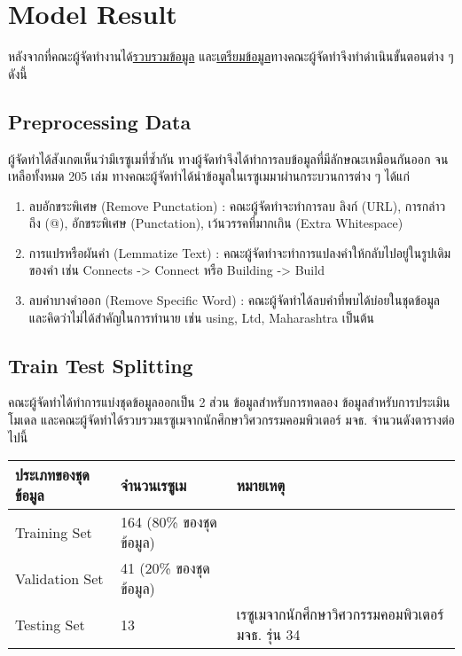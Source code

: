 \section{Model Result}
หลังจากที่คณะผู้จัดทำงานได้\hyperref[subsec:Data Collecting]{รวบรวมข้อมูล} และ\hyperref[subsec:Data Preparation]{เตรียมข้อมูล}ทางคณะผู้จัดทำจึงทำดำเนินขั้นตอนต่าง ๆ ดังนี้
\subsection{Preprocessing Data}
ผู้จัดทำได้สังเกตเห็นว่ามีเรซูเมที่ซ้ำกัน ทางผู้จัดทำจึงได้ทำการลบข้อมูลที่มีลักษณะเหมือนกันออก จนเหลือทั้งหมด 205 เล่ม
ทางคณะผู้จัดทำได้นำข้อมูลในเรซูเมมาผ่านกระบวนการต่าง ๆ ได้แก่
\begin{enumerate}
    \item ลบอักขระพิเศษ (Remove Punctation) : คณะผู้จัดทำจะทำการลบ ลิงก์ (URL), การกล่าวถึง (@), อักขระพิเศษ (Punctation), เว้นวรรคที่มากเกิน (Extra Whitespace)
    \item การแปรหรือผันคำ (Lemmatize Text) : คณะผู้จัดทำจะทำการแปลงคำให้กลับไปอยู่ในรูปเดิมของคำ เช่น Connects -> Connect หรือ Building -> Build
    \item ลบคำบางคำออก (Remove Specific Word) : คณะผู้จัดทำได้ลบคำที่พบได้บ่อยในชุดข้อมูล และคิดว่าไม่ได้สำคัญในการทำนาย เช่น using, Ltd, Maharashtra เป็นต้น
\end{enumerate}
\subsection{Train Test Splitting}
คณะผู้จัดทำได้ทำการแบ่งชุดข้อมูลออกเป็น 2 ส่วน ข้อมูลสำหรับการทดลอง ข้อมูลสำหรับการประเมินโมเดล
และคณะผู้จัดทำได้รวบรวมเรซูเมจากนักศึกษาวิศวกรรมคอมพิวเตอร์ มจธ. จำนวนดังตารางต่อไปนี้
\begin{table}[H]
    \begin{tabularx}{\textwidth}{X|X|l}
        ประเภทของชุดข้อมูล & จำนวนเรซูเม            & หมายเหตุ                                   \\ \hline
        Training Set    & 164 (80\% ของชุดข้อมูล) &                                           \\ \hline
        Validation Set  & 41 (20\% ของชุดข้อมูล)  &                                           \\ \hline
        Testing Set     & 13                   & เรซูเมจากนักศึกษาวิศวกรรมคอมพิวเตอร์ มจธ. รุ่น 34 \\
    \end{tabularx}
\end{table}
